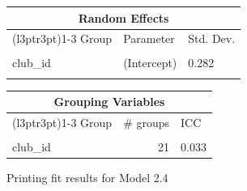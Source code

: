 \documentclass[
  12pt]{article}
\begin{document}
\begin{table}[!h]
\end{table} \begin{table}[!h]
\centering
\begin{tabular}{lll}
\toprule
\multicolumn{3}{c}{Random Effects} \\
\cmidrule(l{3pt}r{3pt}){1-3}
Group & Parameter & Std. Dev.\\
\midrule
\cellcolor{gray!10}{player\_id} & \cellcolor{gray!10}{(Intercept)} & \cellcolor{gray!10}{1.346}\\
club\_id & (Intercept) & 0.282\\
\cellcolor{gray!10}{Residual} & \cellcolor{gray!10}{} & \cellcolor{gray!10}{0.705}\\
\bottomrule
\end{tabular}
\end{table} \begin{table}[!h]
\centering
\begin{tabular}{lrl}
\toprule
\multicolumn{3}{c}{Grouping Variables} \\
\cmidrule(l{3pt}r{3pt}){1-3}
Group & \# groups & ICC\\
\midrule
\cellcolor{gray!10}{player\_id} & \cellcolor{gray!10}{2159} & \cellcolor{gray!10}{0.758}\\
club\_id & 21 & 0.033\\
\bottomrule
\end{tabular}
\end{table}

\newpage

Printing fit results for Model 2.4
\end{document}
